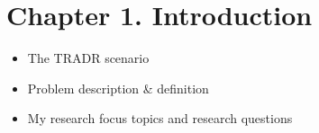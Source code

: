 \chapter{Chapter 1. Introduction}
\begin{itemize}
\item The TRADR scenario
\item Problem description & definition 
\item My research focus topics and research questions
\end{itemize}

    
    
    
  